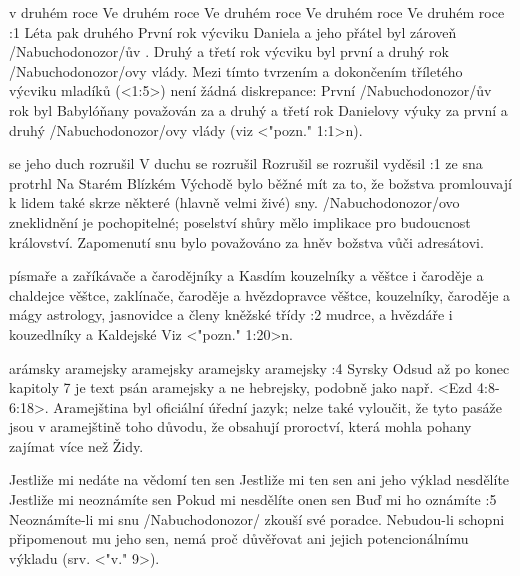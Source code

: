     {v druhém roce} %
    {Ve druhém roce}  %
    {Ve druhém roce} %
    {Ve druhém roce}  %
    {Ve druhém roce}  %
:1 {Léta pak druhého} První rok výcviku Daniela a jeho přátel byl
zároveň \x/Nabuchodonozor/ův . Druhý a třetí rok výcviku byl první a druhý rok
\x/Nabuchodonozor/ovy vlády.  %
Mezi tímto tvrzením a dokončením tříletého výcviku mladíků (<1:5>) není žádná diskrepance: 
První  \x/Nabuchodonozor/ův rok byl Babylóňany považován za  a druhý a třetí rok Danielovy výuky za první a druhý  \x/Nabuchodonozor/ovy vlády (viz <"pozn." 1:1>n).

    {se jeho duch rozrušil} %
    {V duchu se rozrušil}  %
    {Rozrušil se} %
    {rozrušil}  %
    {vyděsil}  %
:1 {ze sna protrhl} Na Starém Blízkém Východě bylo běžné mít za to, že božstva promlouvají k lidem také skrze některé (hlavně velmi živé) sny. \x/Nabuchodonozor/ovo zneklidnění je pochopitelné; poselství shůry mělo implikace pro budoucnost království. Zapomenutí snu bylo považováno za hněv božstva vůči adresátovi.


    {písmaře a zaříkávače a čarodějníky a Kasdím} %
    {kouzelníky a věštce i čaroděje a chaldejce}  %
    {věštce, zaklínače, čaroděje a hvězdopravce} %
    {věštce, kouzelníky, čaroděje a mágy}  %
    {astrology, jasnovidce a členy kněžské třídy}  %
:2 {mudrce, a hvězdáře i kouzedlníky a Kaldejské} Viz <"pozn." 1:20>n. 

    {arámsky} %
    {aramejsky}  %
    {aramejsky} %
    {aramejsky}  %
    {aramejsky}  %
:4 {Syrsky} Odsud až po konec kapitoly 7 je text psán aramejsky a ne hebrejsky, podobně jako např.  <Ezd 4:8-6:18>. Aramejština byl oficiální úřední jazyk; nelze také vyloučit, že tyto pasáže jsou v aramejštině toho důvodu,  že obsahují proroctví, která mohla pohany zajímat více než Židy.

    {Jestliže mi nedáte na vědomí ten sen} %
    {Jestliže mi ten sen ani jeho výklad nesdělíte}  %
    {Jestliže mi neoznámíte sen} %
    {Pokud mi nesdělíte onen sen}  %
    {Buď mi ho oznámíte}  %
:5 {Neoznámíte-li mi snu} \x/Nabuchodonozor/ zkouší své poradce. Nebudou-li schopni připomenout mu jeho sen, nemá proč důvěřovat ani jejich potencionálnímu výkladu (srv. <"v." 9>).


